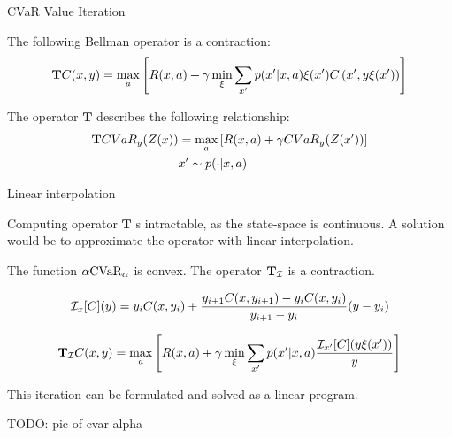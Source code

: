 \documentclass{beamer}
\begin{document}
\begin{frame}{CVaR Value Iteration}

\begin{theorem}
The following Bellman operator is a contraction:
$$\mathbf{T}C(x, y) = \max_a \left[ { R(x, a) + \gamma \min_{\xi} \sum_{x'} p(x'| x, a)\xi(x') C\left( {x', y\xi(x')} \right)} \right]$$
\end{theorem}

\vspace{1cm}

The operator $\mathbf{T}$ describes the following relationship:
\begin{equation*}
\begin{split}
\mathbf{T} CVaR_y(Z(x))&=\max_a \left[ {R(x, a) + \gamma CVaR_{y}(Z(x'))} \right]\\
&x' \sim p(\cdot|x, a)
\end{split}
\end{equation*}

\end{frame}


\begin{frame}{Linear interpolation}

Computing operator $\mathbf{T}$ s intractable, as the state-space is continuous. A solution would be to approximate the operator with linear interpolation.

\begin{theorem}
The function $\alpha\text{CVaR}_\alpha$ is convex. The operator $\mathbf{T}_{\mathcal{I}}$ is a contraction.

$$\mathcal{I}_{x}[C](y)=y_iC(x,y_{i})+\frac{y_{i+1}C(x,y_{i+1})-y_iC(x,y_{i})}{y_{i+1}-y_i}(y-y_i)$$

$$\mathbf{T}_{\mathcal{I}} C(x, y) = \max_a \left[ { R(x, a) + \gamma \min_{\xi} \sum_{x'} p(x'| x, a)\dfrac{\mathcal{I}_{x'} [C](y\xi(x'))}{y}} \right]$$

\end{theorem}

This iteration can be formulated and solved as a linear program.

\end{frame}


\begin{frame}
\center
TODO: pic of cvar alpha

\end{frame}
\end{document}
